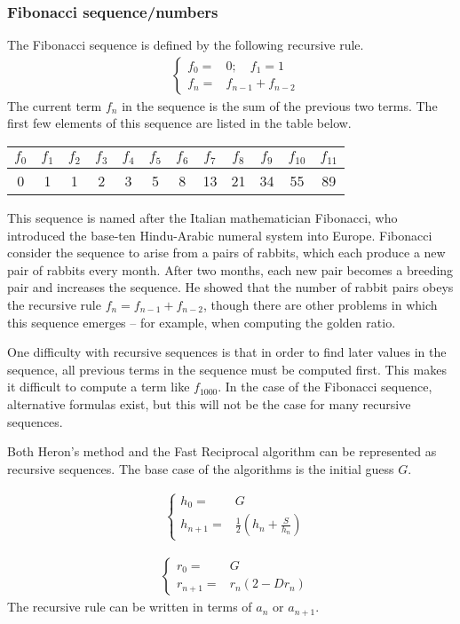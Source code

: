 \documentclass[12pt]{article}
\begin{document}
\subsubsection*{Fibonacci sequence/numbers}
The Fibonacci sequence is defined by the following recursive rule.
\begin{align*}
  &\begin{cases}
    f_0=&0; \quad f_1=1\\
    f_n=&f_{n-1}+f_{n-2}
  \end{cases}
\end{align*}
The current term $f_n$ in the sequence is the sum of the previous two terms. The first few elements of this sequence are listed in the table below.
\begin{center}
\begin{tabular}{|c|c|c|c|c|c|c|c|c|c|c|c|}
\hline
$f_0$ & $f_1$ & $f_2$ & $f_3$ & $f_4$ & $f_5$ & $f_6$ & $f_7$ & $f_8$ & $f_9$ & $f_{10}$ & $f_{11}$  \\
\hline
0 & 1 & 1 & 2& 3 & 5 & 8 & 13 & 21 & 34 & 55 & 89 \\
\hline
\end{tabular}
\end{center}
This sequence is named after the Italian mathematician Fibonacci, who introduced the base-ten Hindu-Arabic numeral system into Europe. Fibonacci consider the sequence to arise from a pairs of rabbits, which each produce a new pair of rabbits every month. After two months, each new pair becomes a breeding pair and increases the sequence. He showed that the number of rabbit pairs obeys the recursive rule $f_n=f_{n-1}+f_{n-2}$, though there are other problems in which this sequence emerges -- for example, when computing the golden ratio.

One difficulty with recursive sequences is that in order to find later values in the sequence, all previous terms in the sequence must be computed first. This makes it difficult to compute a term like $f_{1000}$. In the case of the Fibonacci sequence, alternative formulas exist, but this will not be the case for many recursive sequences.

Both Heron's method and the Fast Reciprocal algorithm can be represented as recursive sequences. The base case of the algorithms is the initial guess $G$.

\begin{align*}
  &\begin{cases}
    h_0=&G\\
    h_{n+1}=&\frac{1}{2} \left( h_n + \frac{S}{h_n} \right)
  \end{cases}
\end{align*}

\begin{align*}
  &\begin{cases}
    r_0=&G\\
    r_{n+1}=&r_n \left( 2-D r_n \right)
  \end{cases}
\end{align*}
The recursive rule can be written in terms of $a_{n}$ or $a_{n+1}$.
\end{document}
